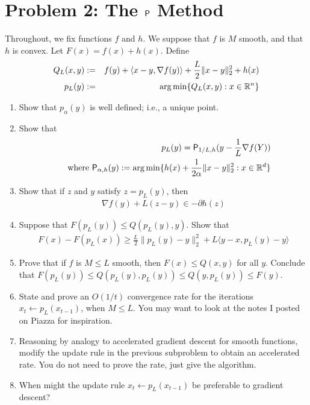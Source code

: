 \documentclass[12pt]{article}
\begin{document}
\section*{Problem 2: The $\mathsf{P}$ Method} 
Throughout, we fix functions $f$ and $h$. We suppose that $f$ is $M$ smooth, and that $h$ is convex. Let $F(x) = f(x) + h(x)$. Define
	\begin{eqnarray}
	Q_{L}(x,y) &:=& f(y) + \langle x - y, \nabla f(y) \rangle + \frac{L}{2}\|x -y\|_2^2 + h(x)\\
	p_{L}(y) &:=& \arg\min\{ Q_{L}(x,y): x \in \mathbb{R}^n\}
	\end{eqnarray}
\begin{enumerate}
	\item Show that $p_{\alpha}(y)$ is well defined; i.e., a unique point.
	\item Show that 
	\begin{eqnarray}
	&&p_{L}(y)  = \mathsf{P}_{1/L,h}( y- \frac{1}{L} \nabla f(Y))\\
	 &&\text{ where } \mathsf{P}_{\alpha,h}(y) := \arg\min\{h(x) + \frac{1}{2\alpha}\|x-y\|^2_2:  x \in \mathbb{R}^d\}
	\end{eqnarray}
	\item Show that if $z$ and $y$ satisfy $z = p_{L}(y)$, then
	\begin{eqnarray}
	\nabla f(y) + L(z-y) \in -\partial h(z)
	\end{eqnarray}
	\item Suppose that $F(p_L(y)) \le Q(p_L(y),y)$. Show that
	\begin{eqnarray}
	F(x) - F(p_L(x)) \ge \frac{L}{2}\|p_L(y) - y\|_2^2 + L\langle y - x, p_L(y) - y \rangle
	\end{eqnarray}
	\item Prove that if $f$ is $M \le L$ smooth, then $F(x) \le Q(x,y)$ for all $y$. Conclude that $F(p_{L}(y)) \le Q(p_{L}(y),p_{L}(y)) \le Q(y,p_L(y)) \le F(y)$. 
	\item State and prove an $O(1/t)$ convergence rate for the iterations $x_{t} \leftarrow p_L(x_{t-1})$, when $M \le L$. You may want to look at the notes I posted on Piazza for inspiration.
	\item Reasoning by analogy to accelerated gradient descent for smooth functions, modify the update rule in the previous subproblem to obtain an accelerated rate. You do not need to prove the rate, just give the algorithm. 
	\item When might the update rule $x_{t} \leftarrow p_L(x_{t-1})$ be preferable to gradient descent? 
\end{enumerate}
\end{document}

